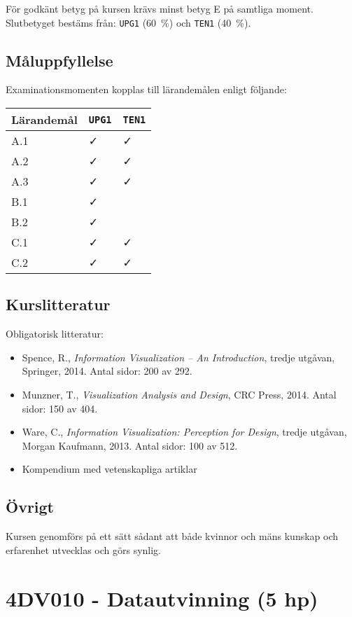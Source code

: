 För godkänt betyg på kursen krävs minst betyg E på samtliga moment.
Slutbetyget bestäms från: \texttt{UPG1} (60~\%) och \texttt{TEN1} (40~\%).

\subsection*{Måluppfyllelse}

Examinationsmomenten kopplas till lärandemålen enligt följande:

\begin{longtable}[]{@{}lll@{}}
\toprule
\textsf{Lärandemål} & \texttt{UPG1} & \texttt{TEN1}\tabularnewline
\midrule
\endhead
A.1 & \faCheck & \faCheck\tabularnewline
A.2 & \faCheck & \faCheck\tabularnewline
A.3 & \faCheck & \faCheck\tabularnewline
B.1 & \faCheck &\tabularnewline
B.2 & \faCheck &\tabularnewline
C.1 & \faCheck & \faCheck\tabularnewline
C.2 & \faCheck & \faCheck\tabularnewline
\bottomrule
\end{longtable}

\subsection*{Kurslitteratur}

Obligatorisk litteratur:

\begin{itemize}
\tightlist
\item
  Spence, R., \emph{Information Visualization -- An Introduction},
  tredje utgåvan, Springer, 2014. Antal sidor: 200 av 292.
\item
  Munzner, T., \emph{Visualization Analysis and Design}, CRC Press,
  2014. Antal sidor: 150 av 404.
\item
  Ware, C., \emph{Information Visualization: Perception for Design},
  tredje utgåvan, Morgan Kaufmann, 2013. Antal sidor: 100 av 512.
\item
  Kompendium med vetenskapliga artiklar
\end{itemize}

\subsection*{Övrigt}

Kursen genomförs på ett sätt sådant att både kvinnor och mäns kunskap och erfarenhet utvecklas och görs synlig.
\pagebreak
\section*{4DV010 - Datautvinning (5 hp)}

